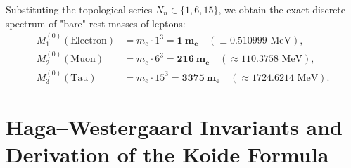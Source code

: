 \documentclass[12pt,a4paper]{article}
\begin{document}
	Substituting the topological series $N_n \in \{1, 6, 15\}$, we obtain the exact discrete spectrum of "bare" rest masses of leptons:
	\begin{align}
	M_1^{(0)} (\text{Electron}) &= m_e \cdot 1^3  = \mathbf{1 \ m_e} \quad (\equiv 0.510999 \text{ MeV}), \\
	M_2^{(0)} (\text{Muon})     &= m_e \cdot 6^3  = \mathbf{216 \ m_e} \quad (\approx 110.3758 \text{ MeV}), \\
	M_3^{(0)} (\text{Tau})      &= m_e \cdot 15^3 = \mathbf{3375 \ m_e} \quad (\approx 1724.6214 \text{ MeV}).
	\end{align}
	
	\section{Haga--Westergaard Invariants and Derivation of the Koide Formula}
	
\end{document}
